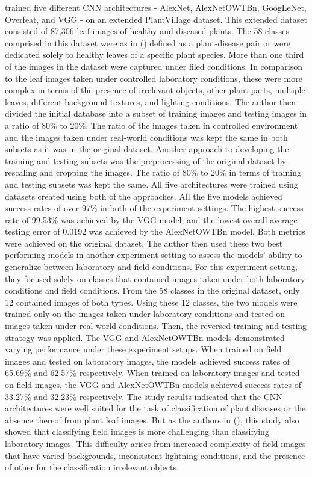 \documentclass{BachelorBUI}
\begin{document}
\textcite{Ferentinos:2018} trained five different CNN architectures - AlexNet, AlexNetOWTBn, GoogLeNet, Overfeat, and VGG - on an extended PlantVillage dataset. This extended dataset consisted of 87,306 leaf images of healthy and diseased plants. The 58 classes comprised in this dataset were as in (\cite{Mohanty:2016}) defined as a plant-disease pair or were dedicated solely to healthy leaves of a specific plant species. More than one third of the images in the dataset were captured under filed conditions. In comparison to the leaf images taken under controlled laboratory conditions, these were more complex in terms of the presence of irrelevant objects, other plant parts, multiple leaves, different background textures, and lighting conditions. The author then divided the initial database into a subset of training images and testing images in a ratio of 80\% to 20\%. The ratio of the images taken in controlled environment and the images taken under real-world conditions was kept the same in both subsets as it was in the original dataset. Another approach to developing the training and testing subsets was the preprocessing of the original dataset by rescaling and cropping the images. The ratio of 80\% to 20\% in terms of training and testing subsets was kept the same. All five architectures were trained using datasets created using both of the approaches. All the five models achieved success rates of over 97\% in both of the experiment settings. The highest success rate of 99.53\% was achieved by the VGG model, and the lowest overall average testing error of 0.0192 was achieved by the AlexNetOWTBn model. Both metrics were achieved on the original dataset. The author then used these two best performing models in another experiment setting to assess the models' ability to generalize between laboratory and field conditions. For this experiment setting, they focused solely on classes that contained images taken under both laboratory conditions and field conditions. From the 58 classes in the original dataset, only 12 contained images of both types. Using these 12 classes, the two models were trained only on the images taken under laboratory conditions and tested on images taken under real-world conditions. Then, the reversed training and testing strategy was applied. The VGG and AlexNetOWTBn models demonstrated varying performance under these experiment setups. When trained on field images and tested on laboratory images, the models achieved success rates of 65.69\% and 62.57\% respectively. When trained on laboratory images and tested on field images, the VGG and AlexNetOWTBn models achieved success rates of 33.27\% and 32.23\% respectively. The study results indicated that the CNN architectures were well suited for the task of classification of plant diseases or the absence thereof from plant leaf images. But as the authors in (\cite{Mohanty:2016}), this study also showed that classifying field images is more challenging than classifying laboratory images. This difficulty arises from increased complexity of field images that have varied backgrounds, inconsistent lightning conditions, and the presence of other for the classification irrelevant objects.
\end{document}
